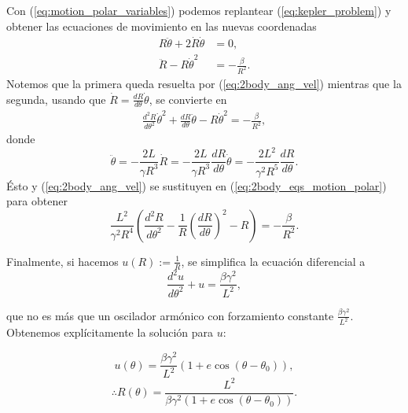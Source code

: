 Con (\ref{eq:motion_polar_variables}) podemos replantear (\ref{eq:kepler_problem}) y obtener las ecuaciones de movimiento en las nuevas coordenadas
\begin{align}
 R \ddot{\theta} + 2 \dot{R} \dot{\theta} &= 0, \\
 \ddot{R} - R \dot{\theta}^2 &= -\frac{\beta}{R^2}.
 \label{eq:2body_eqs_motion_polar}
\end{align}
Notemos que la primera queda resuelta por (\ref{eq:2body_ang_vel}) mientras que la segunda, usando que $\dot{R} = \frac{d R}{d\theta} \dot{\theta}$, se convierte en
\begin{align*}
 \frac{d^2 R}{d \theta^2} \dot{\theta}^2 + \frac{dR}{d\theta} \ddot{\theta} - R \dot{\theta}^2 = - \frac{\beta}{R^2},
\end{align*}
donde 
\begin{equation*}
 \ddot{\theta} = -\frac{2L}{\gamma R^3}\dot{R} = -\frac{2L}{\gamma R^3} \frac{dR}{d\theta}\dot{\theta} = - \frac{2L^2}{\gamma^2 R^5} \frac{dR}{d\theta}.
\end{equation*}
Ésto y (\ref{eq:2body_ang_vel}) se sustituyen en  (\ref{eq:2body_eqs_motion_polar}) para obtener
\begin{equation*}
 \frac{L^2}{\gamma^2 R^4}\left( \frac{d^2R}{d\theta^2} - \frac{1}{R} \left(\frac{dR}{d\theta} \right)^2 -R \right) = - \frac{\beta}{R^2}.
\end{equation*}

Finalmente, si hacemos $u(R) := \frac{1}{R}$, se simplifica la ecuación diferencial a
\begin{equation}
 \frac{d^2u}{d\theta^2} + u = \frac{\beta \gamma^2}{L^2},
\end{equation}

que no es más que un oscilador armónico con forzamiento constante $\frac{\beta \gamma^2}{L^2}$. Obtenemos explícitamente la solución para $u$:

\begin{equation*}
 u(\theta) = \frac{\beta \gamma^2}{L^2} \left( 1 + e \cos (\theta - \theta_0 ) \right) ,
\end{equation*}
\begin{equation}
 \therefore R(\theta) = \frac{L^2}{\beta \gamma^2 \left(1 + e \cos (\theta - \theta_0) \right)}.
 \label{eq:2body_solution}
\end{equation}


